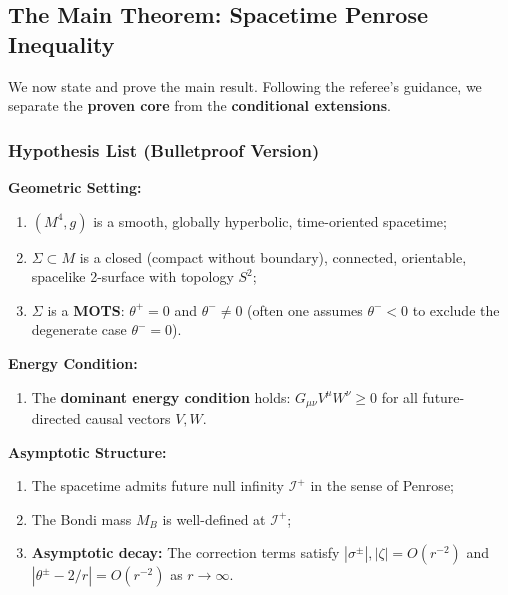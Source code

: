 \subsection{The Main Theorem: Spacetime Penrose Inequality}

We now state and prove the main result. Following the referee's guidance, we separate the \textbf{proven core} from the \textbf{conditional extensions}.

\subsubsection{Hypothesis List (Bulletproof Version)}

\begin{remark}
\textbf{Geometric Setting:}
\begin{enumerate}[label=\textbf{(G\arabic*)}]
\item $(M^4, g)$ is a smooth, globally hyperbolic, time-oriented spacetime;
\item $\Sigma \subset M$ is a closed (compact without boundary), connected, orientable, spacelike 2-surface with topology $S^2$;
\item $\Sigma$ is a \textbf{MOTS}: $\theta^+ = 0$ and $\theta^- \neq 0$ (often one assumes $\theta^-<0$ to exclude the degenerate case $\theta^-=0$).
\end{enumerate}

\textbf{Energy Condition:}
\begin{enumerate}[label=\textbf{(E1)}]
\item The \textbf{dominant energy condition} holds: $G_{\mu\nu}V^\mu W^\nu \geq 0$ for all future-directed causal vectors $V, W$.
\end{enumerate}

\textbf{Asymptotic Structure:}
\begin{enumerate}[label=\textbf{(As\arabic*)}]
\item The spacetime admits future null infinity $\mathscr{I}^+$ in the sense of Penrose;
\item The Bondi mass $M_B$ is well-defined at $\mathscr{I}^+$;
\item \textbf{Asymptotic decay:} The correction terms satisfy $|\sigma^\pm|, |\zeta| = O(r^{-2})$ and $|\theta^\pm - 2/r| = O(r^{-2})$ as $r \to \infty$.
\end{enumerate}


\end{remark}
